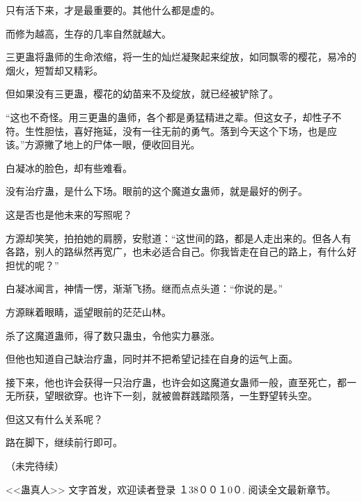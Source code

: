 \begin{this_body}
只有活下来，才是最重要的。其他什么都是虚的。

而修为越高，生存的几率自然就越大。

三更蛊将蛊师的生命浓缩，将一生的灿烂凝聚起来绽放，如同飘零的樱花，易冷的烟火，短暂却又精彩。

但如果没有三更蛊，樱花的幼苗来不及绽放，就已经被铲除了。

“这也不奇怪。用三更蛊的蛊师，各个都是勇猛精进之辈。但这女子，却性子不符。生性胆怯，喜好拖延，没有一往无前的勇气。落到今天这个下场，也是应该。”方源撇了地上的尸体一眼，便收回目光。

白凝冰的脸色，却有些难看。

没有治疗蛊，是什么下场。眼前的这个魔道女蛊师，就是最好的例子。

这是否也是他未来的写照呢？

方源却笑笑，拍拍她的肩膀，安慰道：“这世间的路，都是人走出来的。但各人有各路，别人的路纵然再宽广，也未必适合自己。你我皆走在自己的路上，有什么好担忧的呢？”

白凝冰闻言，神情一愣，渐渐飞扬。继而点点头道：“你说的是。”

方源眯着眼睛，遥望眼前的茫茫山林。

杀了这魔道蛊师，得了数只蛊虫，令他实力暴涨。

但他也知道自己缺治疗蛊，同时并不把希望记挂在自身的运气上面。

接下来，他也许会获得一只治疗蛊，也许会如这魔道女蛊师一般，直至死亡，都一无所获，望眼欲穿。也许下一刻，就被兽群践踏陨落，一生野望转头空。

但这又有什么关系呢？

路在脚下，继续前行即可。

（未完待续）

<<蛊真人>> 文字首发，欢迎读者登录 １38００１0０. 阅读全文最新章节。

\end{this_body}

